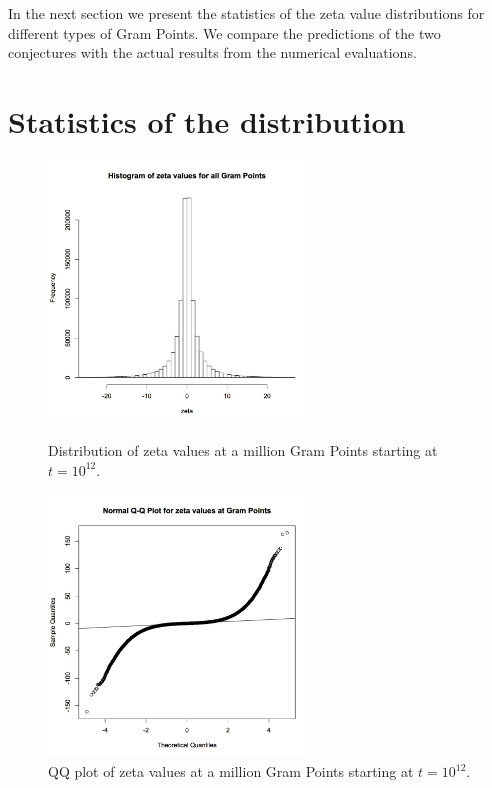 \documentclass[twoside]{article}
\begin{document}
In the next section we present the statistics of the zeta value distributions for different types of Gram Points. We compare the predictions of the two conjectures with the actual results from the numerical evaluations.

\section{\label{sec4}Statistics of the distribution}


\begin{figure}
\centering
\includegraphics[width=0.62\textwidth]{rzeta.jpg}
\caption[]{ 
 Distribution of zeta values at a million Gram Points starting at $t = 10^{12}$.
  }
\vspace{1mm}
\label{allhist}

\includegraphics[width=0.62\textwidth]{qqr.jpg}
\caption[]{ 
 QQ plot of zeta values at a million Gram Points starting at $t = 10^{12}$.
  }
\vspace{1mm}
\label{qqr}
\end{figure}
\end{document}
